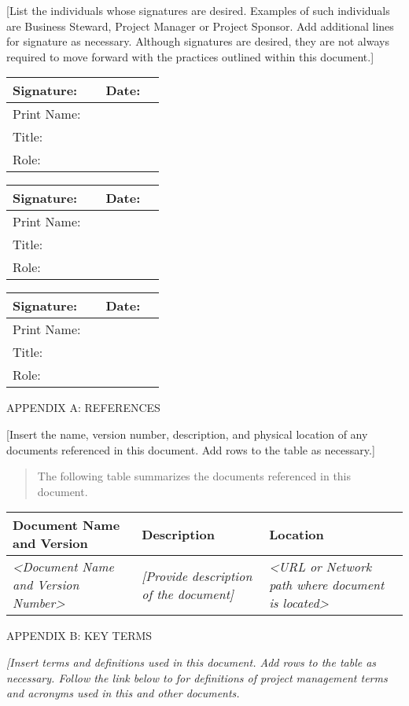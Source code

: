 {[}List the individuals whose signatures are desired. Examples of such
individuals are Business Steward, Project Manager or Project Sponsor.
Add additional lines for signature as necessary. Although signatures are
desired, they are not always required to move forward with the practices
outlined within this document.{]}

\begin{longtable}[]{@{}llll@{}}
\toprule
Signature: & & Date: &\tabularnewline
\midrule
\endhead
Print Name: & & &\tabularnewline
Title: & & &\tabularnewline
Role: & & &\tabularnewline
\bottomrule
\end{longtable}

\begin{longtable}[]{@{}llll@{}}
\toprule
Signature: & & Date: &\tabularnewline
\midrule
\endhead
Print Name: & & &\tabularnewline
Title: & & &\tabularnewline
Role: & & &\tabularnewline
\bottomrule
\end{longtable}

\begin{longtable}[]{@{}llll@{}}
\toprule
Signature: & & Date: &\tabularnewline
\midrule
\endhead
Print Name: & & &\tabularnewline
Title: & & &\tabularnewline
Role: & & &\tabularnewline
\bottomrule
\end{longtable}

\protect\hypertarget{_Toc107027580}{}{}APPENDIX A: REFERENCES

{[}Insert the name, version number, description, and physical location
of any documents referenced in this document. Add rows to the table as
necessary.{]}

\begin{quote}
The following table summarizes the documents referenced in this
document.
\end{quote}

\begin{longtable}[]{@{}lll@{}}
\toprule
\textbf{Document Name and Version} & \textbf{Description} &
\textbf{Location}\tabularnewline
\midrule
\endhead
\emph{\textless{}Document Name and Version Number\textgreater{}} &
\emph{{[}Provide description of the document{]}} & \emph{\textless{}URL
or Network path where document is located\textgreater{}}\tabularnewline
\bottomrule
\end{longtable}

\protect\hypertarget{_Toc106079534}{}{}APPENDIX B: KEY TERMS

\emph{{[}Insert terms and definitions used in this document. Add rows to
the table as necessary. Follow the link below to for definitions of
project management terms and acronyms used in this and other documents.}

